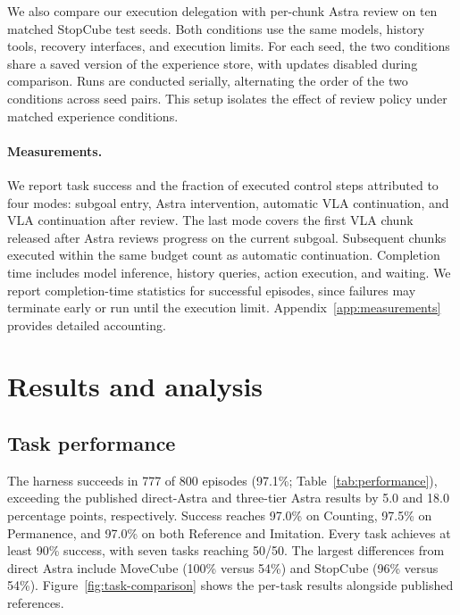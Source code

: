 We also compare our execution delegation with per-chunk Astra review on ten matched StopCube test seeds. Both conditions use the same models, history tools, recovery interfaces, and execution limits. For each seed, the two conditions share a saved version of the experience store, with updates disabled during comparison. Runs are conducted serially, alternating the order of the two conditions across seed pairs. This setup isolates the effect of review policy under matched experience conditions.

\paragraph{Measurements.}
We report task success and the fraction of executed control steps attributed to four modes: subgoal entry, Astra intervention, automatic VLA continuation, and VLA continuation after review. The last mode covers the first VLA chunk released after Astra reviews progress on the current subgoal. Subsequent chunks executed within the same budget count as automatic continuation. Completion time includes model inference, history queries, action execution, and waiting. We report completion-time statistics for successful episodes, since failures may terminate early or run until the execution limit. Appendix~\ref{app:measurements} provides detailed accounting.

\section{Results and analysis}
\label{sec:results}

\subsection{Task performance}

The harness succeeds in 777 of 800 episodes (97.1\%; Table~\ref{tab:performance}), exceeding the published direct-Astra and three-tier Astra results by 5.0 and 18.0 percentage points, respectively. Success reaches 97.0\% on Counting, 97.5\% on Permanence, and 97.0\% on both Reference and Imitation. Every task achieves at least 90\% success, with seven tasks reaching 50/50. The largest differences from direct Astra include MoveCube (100\% versus 54\%) and StopCube (96\% versus 54\%). Figure~\ref{fig:task-comparison} shows the per-task results alongside published references.

